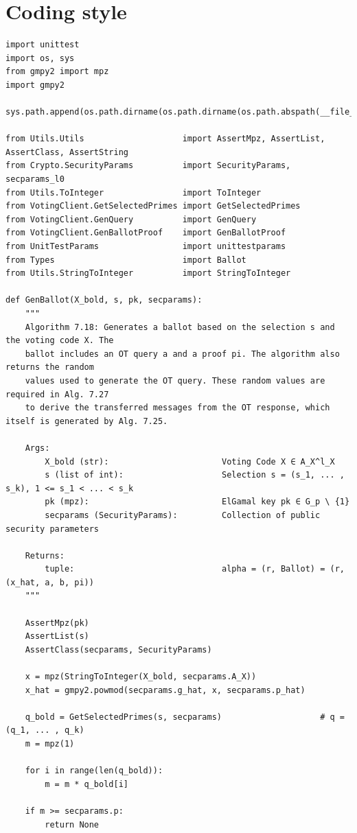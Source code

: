 \documentclass[a4paper,12pt]{report}
\begin{document}
\section{Coding style}
\begin{verbatim}
import unittest
import os, sys
from gmpy2 import mpz
import gmpy2

sys.path.append(os.path.dirname(os.path.dirname(os.path.abspath(__file__))))

from Utils.Utils                    import AssertMpz, AssertList, AssertClass, AssertString
from Crypto.SecurityParams          import SecurityParams, secparams_l0
from Utils.ToInteger                import ToInteger
from VotingClient.GetSelectedPrimes import GetSelectedPrimes
from VotingClient.GenQuery          import GenQuery
from VotingClient.GenBallotProof    import GenBallotProof
from UnitTestParams                 import unittestparams
from Types                          import Ballot
from Utils.StringToInteger          import StringToInteger

def GenBallot(X_bold, s, pk, secparams):
    """
    Algorithm 7.18: Generates a ballot based on the selection s and the voting code X. The
    ballot includes an OT query a and a proof pi. The algorithm also returns the random
    values used to generate the OT query. These random values are required in Alg. 7.27
    to derive the transferred messages from the OT response, which itself is generated by Alg. 7.25.

    Args:
        X_bold (str):                       Voting Code X ∈ A_X^l_X
        s (list of int):                    Selection s = (s_1, ... , s_k), 1 <= s_1 < ... < s_k
        pk (mpz):                           ElGamal key pk ∈ G_p \ {1}
        secparams (SecurityParams):         Collection of public security parameters

    Returns:
        tuple:                              alpha = (r, Ballot) = (r, (x_hat, a, b, pi))
    """

    AssertMpz(pk)
    AssertList(s)
    AssertClass(secparams, SecurityParams)

    x = mpz(StringToInteger(X_bold, secparams.A_X))
    x_hat = gmpy2.powmod(secparams.g_hat, x, secparams.p_hat)

    q_bold = GetSelectedPrimes(s, secparams)                    # q = (q_1, ... , q_k)
    m = mpz(1)

    for i in range(len(q_bold)):
        m = m * q_bold[i]

    if m >= secparams.p:
        return None


\end{verbatim}
\end{document}
